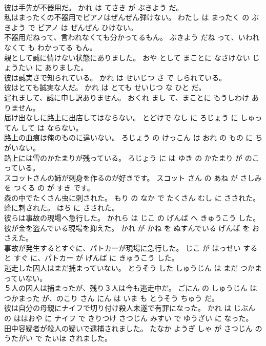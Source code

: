 \documentclass[8pt]{extreport}
\begin{document}
\begin{CJK}{UTF8}{min}
\\	彼は手先が不器用だ。	かれ は てさき が ぶきよう だ。	
\\	私はまったくの不器用でピアノはぜんぜん弾けない。	わたし は まったく の ぶきよう で ピアノ は ぜんぜん ひけない。	
\\	不器用だねって、言われなくても分かってるもん。	ぶきよう だね って、いわれなくて も わかってる もん。	
\\	親として誠に情けない状態にありました。	おや として まことに なさけない じょうたい に ありました。	
\\	彼は誠実さで知られている。	かれ は せいじつ さ で しられている。	
\\	彼はとても誠実な人だ。	かれ は とても せいじつ な ひと だ。	
\\	遅れまして、誠に申し訳ありません。	おくれ まし て、まことに もうしわけ ありません。	
\\	届け出なしに路上に出店してはならない。	とどけで なし に ろじょう に しゅってん して は ならない。	
\\	路上の血痕は俺のものに違いない。	ろじょう の けっこん は おれ の もの に ちがいない。	
\\	路上には雪のかたまりが残っている。	ろじょう に は ゆき の かたまり が のこっている。	
\\	スコットさんの姉が刺身を作るのが好きです。	スコット さん の あね が さしみ を つくる の が すき です。	
\\	森の中でたくさん虫に刺された。	もり の なか で たくさん むし に さされた。	
\\	蜂に刺された。	はち に さされた。	
\\	彼らは事故の現場へ急行した。	かれら は じこ の げんば へ きゅうこう した。	
\\	彼が金を盗んでいる現場を抑えた。	かれ が かね を ぬすんでいる げんば を おさえた。	
\\	事故が発生するとすぐに、パトカーが現場に急行した。	じこ が はっせい する と すぐ に、パトカー が げんば に きゅうこう した。	
\\	逃走した囚人はまだ捕まっていない。	とうそう した しゅうじん は まだ つかまっていない。	
\\	５人の囚人は捕まったが、残り３人は今も逃走中だ。	ごにん の しゅうじん は つかまった が、のこり さん にん は いま も とうそう ちゅう だ。	
\\	彼は自分の母親にナイフで切り付け殺人未遂で有罪になった。	かれ は じぶん の ははおや に ナイフ で きりつけ さつじん みすい で ゆうざい に なった。	
\\	田中容疑者が殺人の疑いで逮捕されました。	たなか ようぎ しゃ が さつじん の うたがい で たいほ されました。	

\end{CJK}
\end{document}
